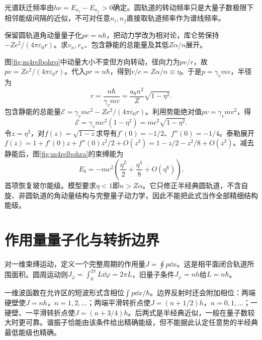 光谱跃迁频率由$h\nu=E_{n_i}-E_{n_f}>0$确定。圆轨道的转动频率只是大量子数极限下相邻能级间隔的近似，不可对任意$n_i,n_f$直接取轨道频率作为谱线频率。

\begin{example}\label{ex:m4relbohr}
保留圆轨道角动量量子化$pr=n\hbar$，把动力学改为相对论，库仑势保持$-Ze^2/(4\pi\varepsilon_0r)$。求$v_n,r_n$、包含静能的总能量及其低$Z\alpha/n$展开。
\end{example}
\begin{solution}
图\ref{fig:m4relbohrq}中动量大小不变但方向转动，径向力为$pv/r$，故$pv=Ze^2/(4\pi\varepsilon_0r)$。代入$pr=n\hbar$，得到$v/c=Z\alpha/n\equiv\eta$。于是$p=\gamma_vmv$，半径为
\[
 r=\frac{n\hbar}{\gamma_vmv}=\frac{a_0n^2}Z\sqrt{1-\eta^2}.
\]
包含静能的总能量$\mathcal E=\gamma_vmc^2-Ze^2/(4\pi\varepsilon_0r)$。利用势能绝对值$pv=\gamma_vmv^2$，得
\[
 \mathcal E=\gamma_vmc^2(1-\eta^2)=mc^2\sqrt{1-\eta^2}.
\]
令$z=\eta^2$，对$f(z)=\sqrt{1-z}$求导有$f'(0)=-1/2$、$f''(0)=-1/4$。泰勒展开$f(z)=1+f'(0)z+f''(0)z^2/2+O(z^3)=1-z/2-z^2/8+O(z^3)$。减去静能后，图\ref{fig:m4relbohra}的束缚能为
\[
 E_b=-mc^2\left(\frac{\eta^2}2+\frac{\eta^4}8+O(\eta^6)\right).
\]
首项恢复玻尔能级。模型要求$\eta<1$即$n>Z\alpha$。它只修正半经典圆轨道，不含自旋、非圆轨道的角动量结构与完整量子动力学，因此不能把此式当作全部精细结构能级。
\end{solution}

\section{作用量量子化与转折边界}\label{th:m4action}
对一维束缚运动，定义一个完整周期的作用量$J=\oint p\dd x$。这是相平面闭合轨道所围面积。圆周运动则$J_\varphi=\int_0^{2\pi}L\dd\varphi=2\pi L$，旧量子条件$J_\varphi=nh$给$L=n\hbar$。

一维波函数在允许区的短波形式含相位$\int p\dd x/\hbar$。边界反射时还会附加相位：两端硬壁使$J=nh$，$n=1,2,\ldots$；两端平滑转折点使$J=(n+1/2)h$，$n=0,1,\ldots$；一硬壁、一平滑转折点使$J=(n+3/4)h$。后两式是半经典近似，一般在量子数较大时更可靠。谐振子恰能由该条件给出精确能级，但不能据此认定任意势的半经典最低能级也精确。

